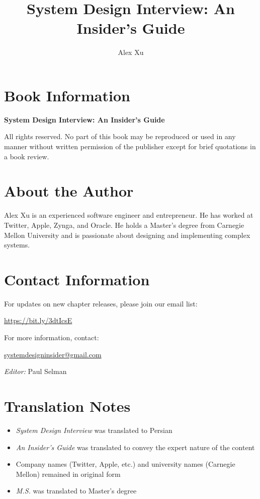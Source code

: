 \documentclass[12pt,a4paper]{article}
\title{System Design Interview: An Insider's Guide}
\author{Alex Xu}
\date{}
\begin{document}
\maketitle

\section*{Book Information}

\textbf{System Design Interview: An Insider's Guide}

All rights reserved. No part of this book may be reproduced or used in any manner without written permission of the publisher except for brief quotations in a book review.

\section*{About the Author}

Alex Xu is an experienced software engineer and entrepreneur. He has worked at Twitter, Apple, Zynga, and Oracle. He holds a Master's degree from Carnegie Mellon University and is passionate about designing and implementing complex systems.

\section*{Contact Information}

For updates on new chapter releases, please join our email list:

\url{https://bit.ly/3dtIcsE}

For more information, contact:

\href{mailto:systemdesigninsider@gmail.com}{systemdesigninsider@gmail.com}

\textit{Editor:} Paul Selman

\section*{Translation Notes}

\begin{itemize}
\item \textit{System Design Interview} was translated to Persian
\item \textit{An Insider's Guide} was translated to convey the expert nature of the content
\item Company names (Twitter, Apple, etc.) and university names (Carnegie Mellon) remained in original form
\item \textit{M.S.} was translated to Master's degree
\end{itemize}
\end{document}
